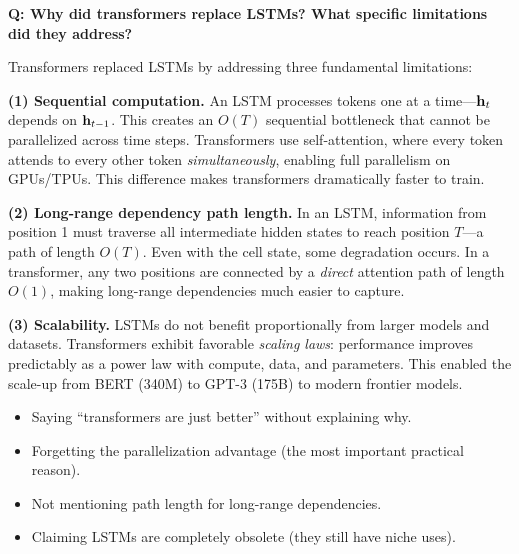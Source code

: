 \begin{interviewq}
\end{interviewq}

\begin{interviewq}
\textbf{Q: Why did transformers replace LSTMs? What specific limitations
did they address?}

 \quad {} \quad
\badgefreq{\freqhigh}

\stronganswer
Transformers replaced LSTMs by addressing three fundamental limitations:

\textbf{(1) Sequential computation.}  An LSTM processes tokens one at a
time---$\mathbf{h}_t$ depends on $\mathbf{h}_{t-1}$.  This creates an $O(T)$ sequential
bottleneck that cannot be parallelized across time steps.  Transformers
use self-attention, where every token attends to every other token
\emph{simultaneously}, enabling full parallelism on GPUs/TPUs.  This
difference makes transformers dramatically faster to train.

\textbf{(2) Long-range dependency path length.}  In an LSTM, information
from position 1 must traverse all intermediate hidden states to reach
position $T$---a path of length $O(T)$.  Even with the cell state, some
degradation occurs.  In a transformer, any two positions are connected
by a \emph{direct} attention path of length $O(1)$, making long-range
dependencies much easier to capture.

\textbf{(3) Scalability.}  LSTMs do not benefit proportionally from
larger models and datasets.  Transformers exhibit favorable
\emph{scaling laws}: performance improves predictably as a power law
with compute, data, and parameters.  This enabled the scale-up from
BERT (340M) to GPT-3 (175B) to modern frontier models.

\redflags
\begin{itemize}
\item Saying ``transformers are just better'' without explaining why.
\item Forgetting the parallelization advantage (the most important
  practical reason).
\item Not mentioning path length for long-range dependencies.
\item Claiming LSTMs are completely obsolete (they still have niche uses).
\end{itemize}



\end{interviewq}
